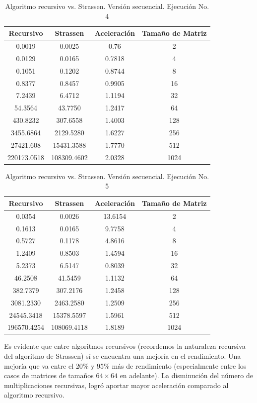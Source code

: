 \documentclass{article}
\begin{document}
\begin{table}[ht]
\centering
\begin{tabular}{|c|c|c|c|}
\hline
\textbf{Recursivo} & \textbf{Strassen} & \textbf{Aceleración} & \textbf{Tamaño de Matriz} \\
\hline
0.0019 & 0.0025 & 0.76 & 2 \\
0.0129 & 0.0165 & 0.7818 & 4 \\
0.1051 & 0.1202 & 0.8744 & 8 \\
0.8377 & 0.8457 & 0.9905 & 16 \\
7.2439 & 6.4712 & 1.1194 & 32 \\
54.3564 & 43.7750 & 1.2417 & 64 \\
430.8232 & 307.6558 & 1.4003 & 128 \\
3455.6864 & 2129.5280 & 1.6227 & 256 \\
27421.608 & 15431.3588 & 1.7770 & 512 \\
220173.0518 & 108309.4602 & 2.0328 & 1024 \\
\hline
\end{tabular}
\caption{Algoritmo recursivo vs. Strassen. Versión secuencial. Ejecución No. 4}
\end{table}

\begin{table}[ht]
\centering
\begin{tabular}{|c|c|c|c|}
\hline
\textbf{Recursivo} & \textbf{Strassen} & \textbf{Aceleración} & \textbf{Tamaño de Matriz} \\
\hline
0.0354 & 0.0026 & 13.6154 & 2 \\
0.1613 & 0.0165 & 9.7758 & 4 \\
0.5727 & 0.1178 & 4.8616 & 8 \\
1.2409 & 0.8503 & 1.4594 & 16 \\
5.2373 & 6.5147 & 0.8039 & 32 \\
46.2508 & 41.5459 & 1.1132 & 64 \\
382.7379 & 307.2176 & 1.2458 & 128 \\
3081.2330 & 2463.2580 & 1.2509 & 256 \\
24545.3418 & 15378.5597 & 1.5961 & 512 \\
196570.4254 & 108069.4118 & 1.8189 & 1024 \\
\hline
\end{tabular}
\caption{Algoritmo recursivo vs. Strassen. Versión secuencial. Ejecución No. 5}
\end{table}


Es evidente que entre algoritmos recursivos (recordemos la naturaleza recursiva del algoritmo de Strassen) sí se encuentra una mejoría en el rendimiento. Una mejoría que va entre el 20\% y 95\% más de rendimiento (especialmente entre los casos de matrices de tamaños \(64 \times 64\) en adelante). La disminución del número de multiplicaciones recursivas, logró aportar mayor aceleración comparado al algoritmo recursivo.\\
\end{document}

